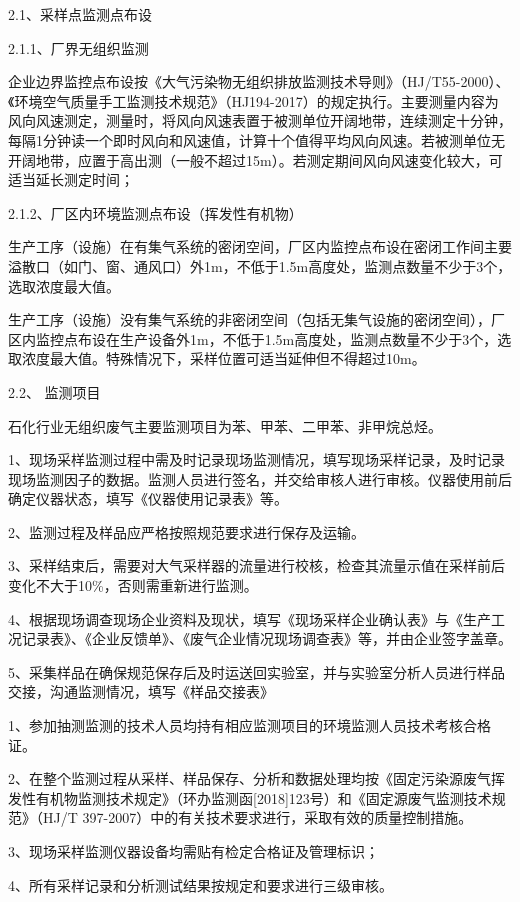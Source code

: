 \documentclass[]{book}
\begin{document}
2.1、采样点监测点布设

2.1.1、厂界无组织监测

企业边界监控点布设按《大气污染物无组织排放监测技术导则》（HJ/T55-2000）、《环境空气质量手工监测技术规范》（HJ194-2017）的规定执行。主要测量内容为风向风速测定，测量时，将风向风速表置于被测单位开阔地带，连续测定十分钟，每隔1分钟读一个即时风向和风速值，计算十个值得平均风向风速。若被测单位无开阔地带，应置于高出测（一般不超过15m）。若测定期间风向风速变化较大，可适当延长测定时间；

2.1.2、厂区内环境监测点布设（挥发性有机物）

生产工序（设施）在有集气系统的密闭空间，厂区内监控点布设在密闭工作间主要溢散口（如门、窗、通风口）外1m，不低于1.5m高度处，监测点数量不少于3个，选取浓度最大值。

生产工序（设施）没有集气系统的非密闭空间（包括无集气设施的密闭空间），厂区内监控点布设在生产设备外1m，不低于1.5m高度处，监测点数量不少于3个，选取浓度最大值。特殊情况下，采样位置可适当延伸但不得超过10m。

2.2、 监测项目

石化行业无组织废气主要监测项目为苯、甲苯、二甲苯、非甲烷总烃。

1、现场采样监测过程中需及时记录现场监测情况，填写现场采样记录，及时记录现场监测因子的数据。监测人员进行签名，并交给审核人进行审核。仪器使用前后确定仪器状态，填写《仪器使用记录表》等。

2、监测过程及样品应严格按照规范要求进行保存及运输。

3、采样结束后，需要对大气采样器的流量进行校核，检查其流量示值在采样前后变化不大于10\%，否则需重新进行监测。

4、根据现场调查现场企业资料及现状，填写《现场采样企业确认表》与《生产工况记录表》、《企业反馈单》、《废气企业情况现场调查表》等，并由企业签字盖章。

5、采集样品在确保规范保存后及时运送回实验室，并与实验室分析人员进行样品交接，沟通监测情况，填写《样品交接表》

1、参加抽测监测的技术人员均持有相应监测项目的环境监测人员技术考核合格证。

2、在整个监测过程从采样、样品保存、分析和数据处理均按《固定污染源废气挥发性有机物监测技术规定》（环办监测函{[}2018{]}123号）和《固定源废气监测技术规范》（HJ/T 397-2007）中的有关技术要求进行，采取有效的质量控制措施。

3、现场采样监测仪器设备均需贴有检定合格证及管理标识；

4、所有采样记录和分析测试结果按规定和要求进行三级审核。
\end{document}
